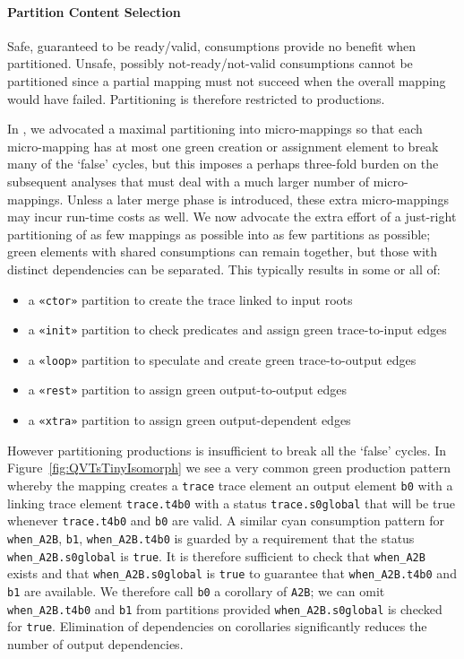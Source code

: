 \documentclass{jot}
\begin{document}
\paragraph{Partition Content Selection}

Safe, guaranteed to be ready/valid, consumptions provide no benefit when partitioned. Unsafe, possibly not-ready/not-valid consumptions cannot be partitioned since a partial mapping must not succeed when the overall mapping would have failed. Partitioning is therefore restricted to productions. 

In \cite{Willink-EXE2016}, we advocated a maximal partitioning into micro-mappings so that each micro-mapping has at most one green creation or assignment element to break many of the `false' cycles, but this imposes a perhaps three-fold burden on the subsequent analyses that must deal with a much larger number of micro-mappings. Unless a later merge phase is introduced, these extra micro-mappings may incur run-time costs as well. We now advocate the extra effort of a just-right partitioning of as few mappings as possible into as few partitions as possible; green elements with shared consumptions can remain together, but those with distinct dependencies can be separated. This typically results in some or all of:
\begin{itemize}
	\item a \verb|«ctor»| partition to create the trace linked to input roots
	\item a \verb|«init»| partition to check predicates and assign green trace-to-input edges
	\item a \verb|«loop»| partition to speculate and create green trace-to-output edges
	\item a \verb|«rest»| partition to assign green output-to-output edges
	\item a \verb|«xtra»| partition to assign green output-dependent edges 
\end{itemize} 

However partitioning productions is insufficient to break all the `false' cycles. In Figure~\ref{fig:QVTsTinyIsomorph} we see a very common green production pattern whereby the mapping creates a \verb|trace| trace element an output element \verb|b0| with a linking trace element \verb|trace.t4b0| with a status \verb|trace.s0global| that will be true whenever \verb|trace.t4b0| and \verb|b0| are valid. A similar cyan consumption pattern for \verb|when_A2B|, \verb|b1|, \verb|when_A2B.t4b0| is guarded by a requirement that the status \verb|when_A2B.s0global| is \verb|true|. It is therefore sufficient to check that \verb|when_A2B| exists and that \verb|when_A2B.s0global| is \verb|true| to guarantee that \verb|when_A2B.t4b0| and \verb|b1| are available. We therefore call \verb|b0| a corollary of \verb|A2B|; we can omit \verb|when_A2B.t4b0| and \verb|b1| from partitions provided \verb|when_A2B.s0global| is checked for \verb|true|. Elimination of dependencies on corollaries significantly reduces the number of output dependencies.
\end{document}
